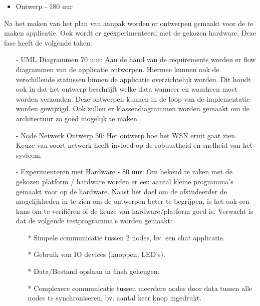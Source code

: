 \documentclass{../local}
\begin{document}
\begin{itemize}
\item Ontwerp - 180 uur
\end{itemize}
Na het maken van het plan van aanpak worden er ontwerpen gemaakt voor de te maken applicatie. Ook wordt er geëxperimenteerd met de gekozen hardware. Deze fase heeft de volgende taken:

\begin{itemize}
\item[-] UML Diagrammen 70 uur: Aan de hand van de requirements worden er flow diagrammen van de applicatie ontworpen. Hiermee kunnen ook de verschillende statussen binnen de applicatie overzichtelijk worden. Dit houdt ook in dat het ontwerp beschrijft welke data wanneer en waarheen moet worden verzonden. Deze ontwerpen kunnen in de loop van de implementatie worden gewijzigd. Ook zullen er klassendiagrammen worden gemaakt om de architectuur zo goed mogelijk te maken.

\item[-] Node Netwerk Ontwerp 30: Het ontwerp hoe het WSN eruit gaat zien. Keuze van soort netwerk heeft invloed op de robuustheid en snelheid van het systeem.

\item[-] Experimenteren met Hardware - 80 uur: Om bekend te raken met de gekozen platform / hardware worden er een aantal kleine programma's gemaakt voor op de hardware. Naast het doel om de afstudeerder de mogelijkheden in te zien om de ontwerpen beter te begrijpen, is het ook een kans om te verifiëren of de keuze van hardware/platform goed is. Verwacht is dat de volgende testprogramma's worden gemaakt:
\begin{itemize}
\item[*] Simpele communicatie tussen 2 nodes, bv. een chat applicatie.
\item[*] Gebruik van IO devices (knoppen, LED's).
\item[*] Data/Bestand opslaan in flash geheugen.
\item[*] Complexere communicatie tussen meerdere nodes door data tussen alle nodes te synchroniseren, bv. aantal keer knop ingedrukt.
\end{itemize}
\end{itemize}
\end{document}
